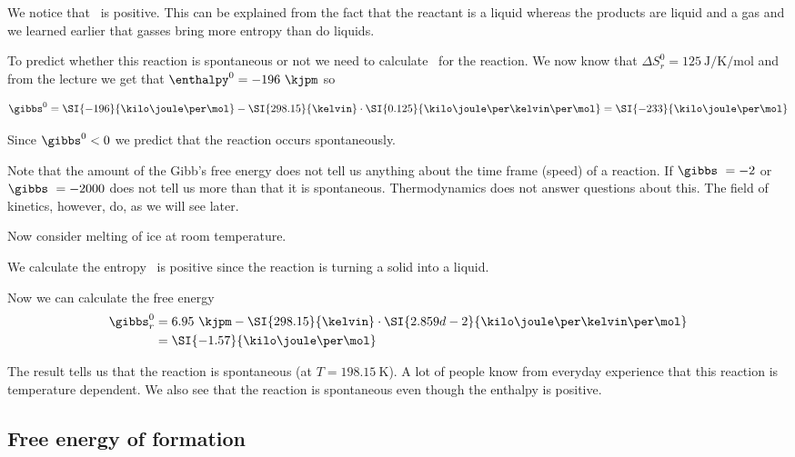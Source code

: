 \documentclass[../mit-general-chemistry.tex]{subfiles}
\begin{document}
We notice that \dS\ is positive. This can be explained from the fact
that the reactant is a liquid whereas the products are liquid and a
gas and we learned earlier that gasses bring more entropy than do
liquids.

To predict whether this reaction is spontaneous or not we need to
calculate \gibbs\ for the reaction. We now know that $\Delta S^0_r =
125~\si{\joule\per\kelvin\per\mol}$ and from the lecture we get that
$\enthalpy^0 = -196~\kjpm$ so

\begin{equation*}
  \gibbs^0 = \SI{-196}{\kilo\joule\per\mol}
  - \SI{298.15}{\kelvin}
  \cdot \SI{0.125}{\kilo\joule\per\kelvin\per\mol}
  = \SI{-233}{\kilo\joule\per\mol}
\end{equation*}

Since $\gibbs^0 < 0$ we predict that the reaction occurs
spontaneously.

Note that the amount of the Gibb's free energy does not tell us
anything about the time frame (speed) of a reaction. If $\gibbs\ = -2$
or $\gibbs\ = -2000$ does not tell us more than that it is
spontaneous. Thermodynamics does not answer questions about this. The
field of kinetics, however, do, as we will see later.

Now consider melting of ice at room temperature.

We calculate the entropy
\dS\ is positive since the reaction is turning a solid into a liquid.

Now we can calculate the free energy
\begin{align*}
  \gibbs_r^0 &= 6.95~\kjpm
  - \SI{298.15}{\kelvin}
  \cdot \SI{2.859d-2}{\kilo\joule\per\kelvin\per\mol} \\
  &= \SI{-1.57}{\kilo\joule\per\mol}\\
\end{align*}

The result tells us that the reaction is spontaneous (at $T =
\SI{198.15}{\kelvin}$). A lot of people know from everyday experience
that this reaction is temperature dependent. We also see that the
reaction is spontaneous even though the enthalpy is positive.




\subsection{Free energy of formation}
\end{document}
